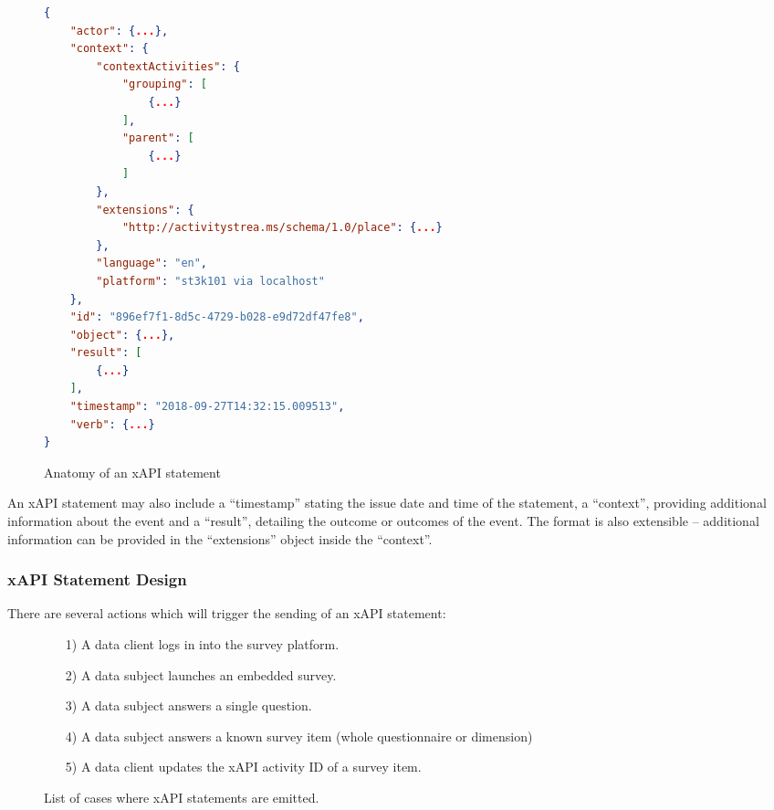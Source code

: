         \begin{figure}[H]
            \begin{lstlisting}[language=JSON]
{
    "actor": {...},
    "context": {
        "contextActivities": {
            "grouping": [
                {...}
            ],
            "parent": [
                {...}
            ]
        },
        "extensions": {
            "http://activitystrea.ms/schema/1.0/place": {...}
        },
        "language": "en",
        "platform": "st3k101 via localhost"
    },
    "id": "896ef7f1-8d5c-4729-b028-e9d72df47fe8",
    "object": {...},
    "result": [
        {...}
    ],
    "timestamp": "2018-09-27T14:32:15.009513",
    "verb": {...}
}

            \end{lstlisting}
            \caption{Anatomy of an xAPI statement}
            \label{fig:anatomy-xapi-statement}
        \end{figure}
    
    An xAPI statement may also include a ``timestamp'' stating the
    issue date and time of the statement, a ``context'', providing
    additional information about the event and a ``result'', detailing
    the outcome or outcomes of the event. The format is also extensible --
    additional information can be provided in the ``extensions''
    object inside the ``context''.

\subsubsection{xAPI Statement Design}
\label{section:concept:xapi-statement-design}
    There are several actions which will trigger the sending of an
    xAPI statement:

    \begin{figure}[H]
        \begin{itemize}
            \item[1)] A data client logs in into the survey platform.
            \item[2)] A data subject launches an embedded survey.
            \item[3)] A data subject answers a single question.
            \item[4)] A data subject answers a known survey item (whole questionnaire or dimension)
            \item[5)] A data client updates the xAPI activity ID of a survey item.
        \end{itemize}
        \caption{List of cases where xAPI statements are emitted.}
        \label{fig:xapi-statement-list}
    \end{figure}

